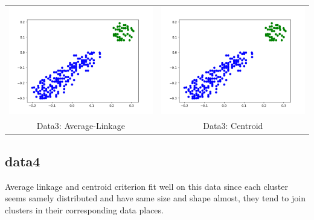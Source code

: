 \documentclass{article}
\begin{document}
\begin{tabular}{c|c}
\includegraphics[scale=0.4]{hac_images/data3average.png}&\includegraphics[scale=0.4]{hac_images/data3centroid.png}\\
{Data3: Average-Linkage}&{Data3: Centroid}\\

\end{tabular}

\subsection{data4}
Average linkage and centroid criterion fit well on this data since each cluster seems samely distributed and have same size and shape almost, they tend to join clusters in their corresponding data
places.\\
\end{document}
